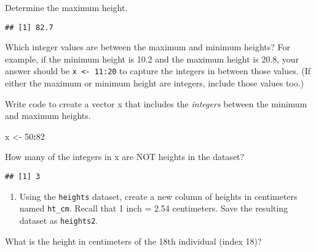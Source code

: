 \documentclass[]{article}
\newenvironment{Shaded}{\begin{snugshade}}{\end{snugshade}}
\newcommand{\DecValTok}[1]{\textcolor[rgb]{0.00,0.00,0.81}{#1}}
\newcommand{\KeywordTok}[1]{\textcolor[rgb]{0.13,0.29,0.53}{\textbf{#1}}}
\newcommand{\NormalTok}[1]{#1}
\newcommand{\OperatorTok}[1]{\textcolor[rgb]{0.81,0.36,0.00}{\textbf{#1}}}
\newcommand{\StringTok}[1]{\textcolor[rgb]{0.31,0.60,0.02}{#1}}
\providecommand{\tightlist}{%
  \setlength{\itemsep}{0pt}\setlength{\parskip}{0pt}}
\begin{document}
Determine the maximum height.

\begin{Shaded}
\end{Shaded}

\begin{verbatim}
## [1] 82.7
\end{verbatim}

Which integer values are between the maximum and minimum heights? For
example, if the minimum height is 10.2 and the maximum height is 20.8,
your answer should be \texttt{x\ \textless{}-\ 11:20} to capture the
integers in between those values. (If either the maximum or minimum
height are integers, include those values too.)

Write code to create a vector x that includes the \emph{integers}
between the minimum and maximum heights.

\begin{Shaded}
\begin{Highlighting}[]
\NormalTok{x <-}\StringTok{ }\DecValTok{50}\OperatorTok{:}\DecValTok{82}
\end{Highlighting}
\end{Shaded}

How many of the integers in x are NOT heights in the dataset?

\begin{Shaded}
\end{Shaded}

\begin{verbatim}
## [1] 3
\end{verbatim}

\begin{enumerate}
\def\labelenumi{\arabic{enumi}.}
\setcounter{enumi}{5}
\tightlist
\item
  Using the \texttt{heights} dataset, create a new column of heights in
  centimeters named \texttt{ht\_cm}. Recall that 1 inch = 2.54
  centimeters. Save the resulting dataset as \texttt{heights2}.
\end{enumerate}

What is the height in centimeters of the 18th individual (index 18)?
\end{document}
